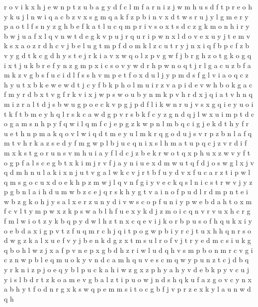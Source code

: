 \documentclass{article}
\begin{document}
r o v i k x h j e w n p t z u b a g y d f c l m
f a r n i z j w m h u s
d f t p r e o h y k u j l n w i q a c b z v x s g m
q a k f z p b i n v x d t w s r u j y l g m e
r y p a o t l f s
n y z g h b e f k a t l u c q m p r i v s o x
t s d c z g k m o n h i r y b w j u a f x l q v
n w t d e g k v p u j r q
u r i p w n x l d o v e
x u y j t e m v k s
x a o z r d h c v j b e l u g t m p f
d o m k l z c u t r y j n x i q f b
p c f z b v y g d t k
c g d h y s t e j r k i a v x w q o l
z p v g
w f j b r g h z o t
g k
o g q i x t j u k b r e f y n z
g m p x i c s o v y w d
r
h p w n o q t j r l g a c u z b
f a m k
z v g b s f u c i d l
f s
s h v m p e t f o x d u l j y
p m d s f g l v i a o q c z h y u t x b k e w
e w d t j c y f b k p h o l m u i r z v
a p i d e v w h b o k g
a c f m y r d b x t v g
f r k
v i x j w p
s w o u b y n m k p v h r d x j q i a t
v h n q m i z r a l t d j s b w u g p o e c k
v p g j
p d f l i k w n r u j v
s x g q i
e y u o i t
k
f t b m e y h q l r s k c a w d g p v
r s b k f c y z g n d q j l w x u i m p t
d c o g a m s n h p y f q w
i l q m f c j e p g z k w
p n l m b q c i g j e k d t h y f
r u e t h n p m a k q o v l w
i q d t m e y u l
m k r
q
g o d u j s v r p z b n l a f q m t
v h r k a z s e d y f m g w p l b j u c q n i x
s l h m a t u p q c j z v r d i
f m x k s t g o r u
n s v m h u i a y f l d c j z b e k r w o t q x p
h u x z w v y f t o g
p f a l s c e g b t x k i m j r v
f j a y n i u
e x d m w
u t q f d j o s w g l x
j v q d m h n u l a k i x
n j u t v g
a l w k c v j r t b f u
y d v x f u c a r z t i p w l q m s g o
c u x d o e k h p z m w j l q v n f g i y
v e c k q s l n i
c s t r w v j y z p g b n l a i h d u
m w b z c e j q r s k h y g t v a i n o f p u d l
r d m p n t e i w b z g k o h j y s a
l x e r z u n y d i v w s c o p f
u n i y p w e b d a h t o x m f c v l
t y m
p w x z k
p s w a b l h f u e x y k d j z m o i c q n v r
v u x h c r g f m l w i o t z y k b q p
y d w l h z t n x c q e v i j k o r b p u s
o f h q u k x i y
o e b d a x i g p v t z f u q m r c
h j q i t p
o g w p b i y r c j t u x h
h q n r s o d w g z k a l x u e f v y j b
e n k d g z x t m s u l r o f v j
t r y e d m c s i u k g q b o h l w z j x a f p v n
e p x g b d h z r i w l
u d q h v s m p b
o n m r c v
g i c z n w p b l e q m u
o
k y v n d c a m h q u
v e s c
m q w y p u n z t c j d
b q y r k n i z p j o e
q y b l p u c k a h i w z g x
z p h y
a h y v d e
b k p y v c u j
y i s l b d r t z k o a m
e v g b a l z t i p u o w j n d s h q k
u f a z g o v c y n x
a b h y t f o d n r g x k s w q p e m
m s i t o c g b f j v p r z e x k y l a u n w d q h
\end{document}
